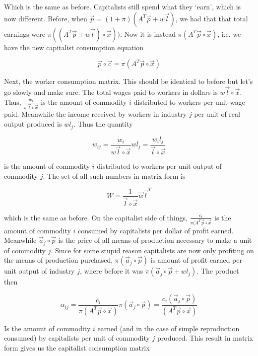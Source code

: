 \documentclass{article}
\theoremstyle{definition}
\begin{document}
Which is the same as before. Capitalists still spend what they `earn', which is now different. Before, when $\vec{p} = (1+\pi)(A^T\vec{p}+w\vec{l})$, we had that that total earnings were $\pi((A^T\vec{p}+w\vec{l})\circ \vec{x}))$. Now it is instead $\pi(A^T\vec{p}\circ \vec{x})$, i.e. we have the new capitalist consumption equation

\begin{equation}\label{spendwhattheyearn2}
    \vec{p}\circ \vec{c} = \pi(A^T\vec{p}\circ \vec{x})
\end{equation}

Next, the worker consumption matrix. This should be identical to before but let's go slowly and make sure. The total wages paid to workers in dollars is $w\vec{l}\circ \vec{x}$. Thus, $\frac{w_i}{w\vec{l} \circ \vec{x}}$ is the amount of commodity $i$ distributed to workers per unit wage paid. Meanwhile the income received by workers in industry $j$ per unit of real output produced is $wl_j$. Thus the quantity

\[ w_{ij} = \frac{w_i}{w\vec{l}\circ \vec{x}}wl_j = \frac{w_il_j}{\vec{l}\circ\vec{x}} \]

is the amount of commodity $i$ distributed to workers per unit output of commodity $j$. The set of all such numbers in matrix form is

\[ W = \frac{1}{\vec{l}\circ \vec{x}}\vec{w}\vec{l}^T \]

which is the same as before. On the capitalist side of things, $\frac{c_i}{\pi(A^T\vec{p}\circ \vec{x}}$ is the amount of commodity $i$ consumed by capitalists per dollar of profit earned. Meanwhile $\vec{a}_j \circ \vec{p}$ is the price of all means of production necessary to make a unit of commodity $j$. Since for some stupid reason capitalists are now only profiting on the means of production purchased, $\pi(\vec{a}_j \circ \vec{p})$ is amount of profit earned per unit output of industry $j$, where before it was $\pi(\vec{a}_j \circ \vec{p}+wl_j)$. The product then

\begin{equation}
    \alpha_{ij} = \frac{c_i}{\pi(A^T\vec{p}\circ \vec{x})}\pi(\vec{a}_j \circ \vec{p}) = \frac{c_i(\vec{a}_j\circ \vec{p})}{(A^T\vec{p} \circ \vec{x})}
\end{equation}

Is the amount of commodity $i$ earned (and in the case of simple reproduction consumed) by capitalists per unit of commodity $j$ produced. This result in matrix form gives us the capitalist consumption matrix
\end{document}
